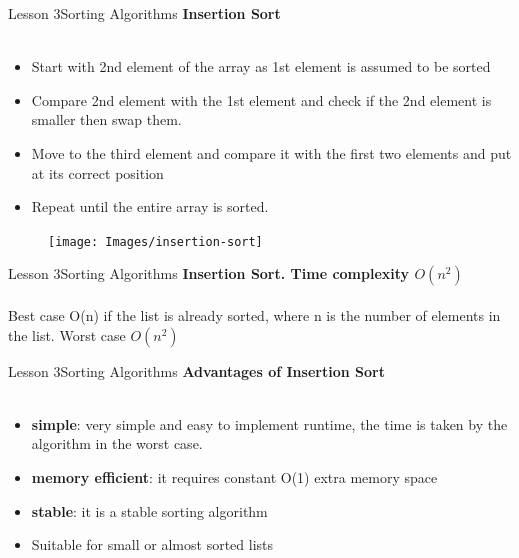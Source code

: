 \documentclass[aspectratio=1610]{beamer}
\begin{document}

\begin{frame}{Lesson 3}{Sorting Algorithms}
\LARGE
\textbf{Insertion Sort}\\~\\
\begin{minipage}{0.65\textwidth}
\Large
\begin{itemize}
    \item Start with 2nd element of the array as 1st element is assumed to be sorted
    \item Compare 2nd element with the 1st element and check if the 2nd element is smaller then swap them.
    \item Move to the third element and compare it with the first two elements and put at its correct position
    \item Repeat until the entire array is sorted.
\end{itemize}
  \end{minipage}
\begin{minipage}{.0\textwidth}
      \begin{figure}
        \texttt{[image: Images/insertion-sort]}
      \end{figure}
  \end{minipage}  
\end{frame}


\begin{frame}{Lesson 3}{Sorting Algorithms}
\LARGE
\textbf{Insertion Sort. Time complexity $O(n^2)$}\\~\\
Best case O(n) if the list is already sorted, where n is the number of elements in
the list. Worst case $O(n^2)$
\end{frame}


\begin{frame}{Lesson 3}{Sorting Algorithms}
\LARGE
\textbf{Advantages of Insertion Sort}\\~\\
\Large
\begin{itemize}
	\item \textbf{simple}: very simple and easy to implement
 runtime, the time is taken by the algorithm in the worst case.
	\item \textbf{memory efficient}: it requires constant O(1) extra memory space
	\item \textbf{stable}: it is a stable sorting algorithm
	\item Suitable for small or almost sorted lists
\end{itemize}
\end{frame}
\end{document}
